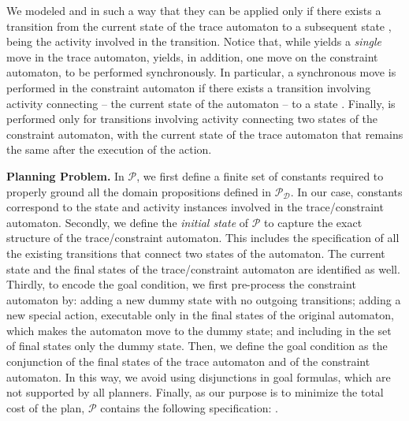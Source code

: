 \noindent
We modeled  and  in such a way that they can be applied only if there exists a transition from the current state  of the trace automaton to a subsequent state , being  the activity involved in the transition.
Notice that, while  yields a \emph{single} move in the trace automaton,  yields, in addition, one move on the constraint automaton, to be performed synchronously. In particular, a synchronous move is performed in the constraint automaton if there exists a transition involving activity  connecting  -- the current state of the automaton -- to a state .
%
Finally,  is performed only for transitions involving activity  connecting two states of the constraint automaton, with the current state of the trace automaton that remains the same after the execution of the action.
%

\smallskip
\noindent
\textbf{Planning Problem.}
%
In $\mathcal{P}$, we first define a finite set of constants required to properly ground all the domain propositions defined in $\mathcal{P_D}$. In our case, constants correspond to the state and activity instances involved in the trace/constraint automaton.
%
Secondly, we define the \emph{initial state} of $\mathcal{P}$ to capture the exact structure of the trace/constraint automaton. This includes the specification of all the existing transitions that connect two states of the automaton. The current state and the final states of the trace/constraint automaton are identified as well.
%
Thirdly, to encode the goal condition, we first pre-process the constraint automaton by: \myi adding a new dummy state with no outgoing transitions; \myii adding a new special action, executable only in the final states of the original automaton, which makes the automaton move to the dummy state; and \myiii including in the set of final states only the dummy state. Then, we define the goal condition as the conjunction of the final states of the trace automaton and of the constraint automaton. In this way, we avoid using disjunctions in goal formulas, which are not supported by all planners.
%
Finally, as our purpose is to minimize the total cost of the plan, $\mathcal{P}$ contains the following specification: . 